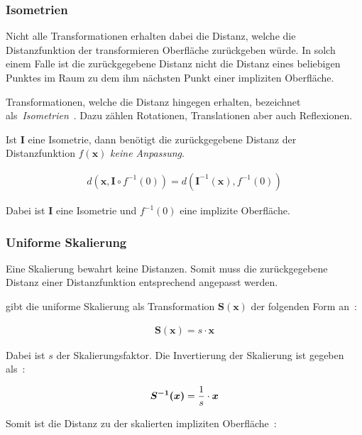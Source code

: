 \subsubsection{Isometrien}
\label{ssubsec:implicit_surfaces_ops_isometries}

Nicht alle Transformationen erhalten dabei die Distanz, welche die
Distanzfunktion der transformieren Oberfläche zurückgeben würde. In
solch einem Falle ist die zurückgegebene Distanz nicht die Distanz eines
beliebigen Punktes im Raum zu dem ihm nächsten Punkt einer impliziten
Oberfläche.

Transformationen, welche die Distanz hingegen erhalten,
bezeichnet~\citeauthor{hart_sphere_1994}
als~\textit{Isometrien}~\parencite[S. 534]{hart_sphere_1994}. Dazu
zählen Rotationen, Translationen aber auch Reflexionen.

Ist $\bm{I}$ eine Isometrie, dann benötigt die zurückgegebene Distanz der
Distanzfunktion $f(\bm{x})$ \textit{keine Anpassung}.

\begin{gather}
    d(\bm{x}, \bm{I} \circ f^{-1}(0)) = d(\bm{I}^{-1}(\bm{x}), f^{-1}(0))
\end{gather}

Dabei ist $\bm{I}$ eine Isometrie und $f^{-1}(0)$ eine implizite
Oberfläche.

\subsubsection{Uniforme Skalierung}
\label{ssubsec:implicit_surfaces_ops_scaling}

Eine Skalierung bewahrt keine Distanzen. Somit muss die zurückgegebene
Distanz einer Distanzfunktion entsprechend angepasst werden.

\citeauthor{hart_sphere_1994} gibt die uniforme Skalierung als
Transformation $\bm{S(x)}$  der folgenden Form an~\parencite[S. 534]{hart_sphere_1994}:

\begin{gather}
    \bm{S(x)} = s \cdot \bm{x}
\end{gather}

Dabei ist $s$ der Skalierungsfaktor. Die Invertierung der Skalierung
ist gegeben als~\parencite[S. 534]{hart_sphere_1994}:

\begin{gather}
    \bm{S^{-1}(x)} = {1 \over s} \cdot \bm{x}
\end{gather}

Somit ist die Distanz zu der skalierten impliziten
Oberfläche~\parencite[S. 534]{hart_sphere_1994}:

